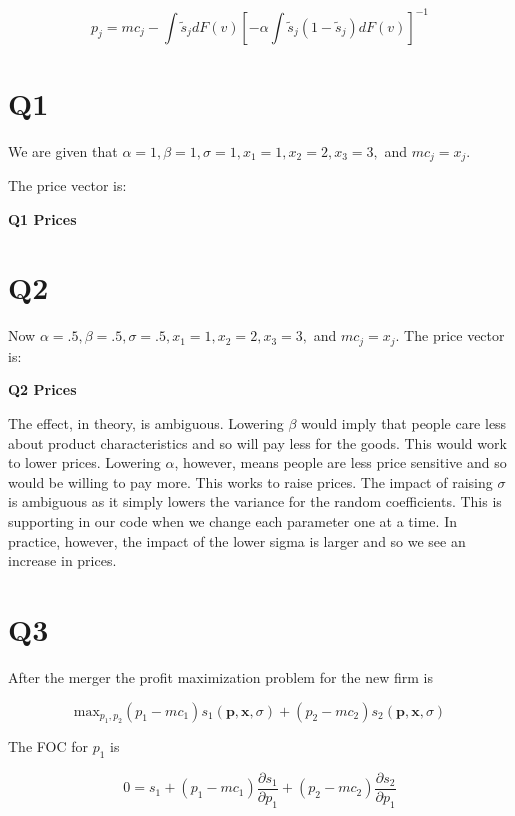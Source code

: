 \documentclass{article}
\newcommand{\1}{\mathbbm{1}}
\begin{document}
$$p_j = mc_j - \int \tilde{s}_j dF(v)[ -\alpha \int \tilde{s}_j(1-\tilde{s}_j)dF(v)]^{-1}$$

\section{Q1}
We are given that $\alpha = 1, \beta = 1, \sigma = 1, x_1 = 1, x_2 = 2, x_3 = 3,$ and $mc_j = x_j$. 

The price vector is: 

\begin{center}
	\centering
	\textbf{Q1 Prices }\par\medskip
	\scalebox{1}{
		
	}
\end{center}

\section{Q2}
Now $\alpha = .5, \beta = .5, \sigma = .5, x_1 = 1, x_2 = 2, x_3 = 3,$ and $mc_j = x_j$. 
The price vector is: 

\begin{center}
	\centering
	\textbf{Q2 Prices}\par\medskip
	\scalebox{1}{
		
	}
\end{center}

The effect, in theory, is ambiguous. Lowering $\beta$ would imply that people care less about product characteristics and so will pay less for the goods. This would work to lower prices. Lowering $\alpha$, however, means people are less price sensitive and so would be willing to pay more. This works to raise prices. The impact of raising $\sigma$ is ambiguous as it simply lowers the variance for the random coefficients. This is supporting in our code when we change each parameter one at a time. In practice, however, the impact of the lower sigma is larger and so we see an increase in prices.


\section{Q3}
After the merger the profit maximization problem for the new firm is  

$$\text{max}_{p_1, p_2} (p_1 - mc_1)s_1(\bm p, \bm x, \sigma) + (p_2 - mc_2)s_2(\bm p, \bm x, \sigma)$$

The FOC for $p_1$ is 

$$0 = s_1 + (p_1 - mc_1)\frac{\partial s_1}{\partial p_1}   + (p_2 - mc_2)\frac{\partial s_2}{\partial p_1}$$
\end{document}

